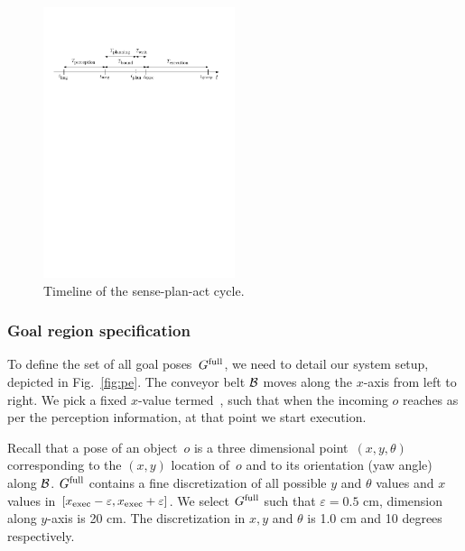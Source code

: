 \documentclass[conference]{IEEEtran}
\begin{document}
\begin{figure}[t]
    \centering
    \includegraphics[width=0.5\textwidth]{figs/timeline2.pdf}
    \caption{\CaptionTextSize Timeline of the sense-plan-act cycle.}
    \label{fig:tl}
\end{figure}

\subsubsection{Goal region specification}
To define the set of all goal poses~$G^{\textrm{full}}$, we need to detail our system setup, depicted in Fig.~\ref{fig:pe}.
The conveyor belt $\mathcal{B}$ moves along the $x$-axis from left to right.
We pick a fixed $x$-value termed~\Xexec, such that when the incoming $o$ reaches \Xexec as per the perception information, at that point we start execution.

%
Recall that a pose of an object~$o$ is a three dimensional point~$(x,y,\theta)$ corresponding to the $(x,y)$ location of~$o$ and to its orientation (yaw angle) along $\mathcal{B}$.
%
$G^{\textrm{full}}$ contains a fine discretization of all possible $y$ and $\theta$ values and $x$ values in  $[x_{\textrm{exec}}-\varepsilon, x_{\textrm{exec}}+\varepsilon]$.
We select $G^{\textrm{full}}$ such that $\varepsilon = 0.5$ cm, dimension along $y$-axis is 20 cm. The discretization in $x,y$ and $\theta$ is 1.0 cm and 10 degrees respectively.
\end{document}
